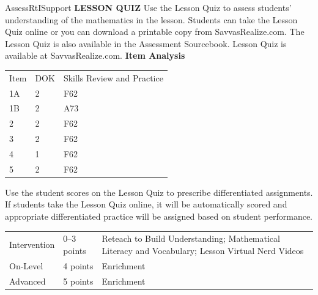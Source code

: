 \documentclass{article}
\newenvironment{te-addendum}[2]{}{}     %
\begin{document}
\begin{te-addendum}{Assess}{RtISupport}
\textbf{LESSON QUIZ}
Use the Lesson Quiz to assess students' understanding of the mathematics in the lesson.
Students can take the Lesson Quiz online or you can download a printable copy from SavvasRealize.com. The Lesson Quiz is also available in the Assessment Sourcebook.
Lesson Quiz is available at SavvasRealize.com.
\textbf{Item Analysis}
\begin{tabular}{lll}
Item & DOK & Skills Review and Practice \\
1A & 2 & F62 \\
1B & 2 & A73 \\
2 & 2 & F62 \\
3 & 2 & F62 \\
4 & 1 & F62 \\
5 & 2 & F62 \\
\end{tabular}
Use the student scores on the Lesson Quiz to prescribe differentiated assignments.
If students take the Lesson Quiz online, it will be automatically scored and appropriate differentiated practice will be assigned based on student performance.
\begin{tabular}{lll}
Intervention & 0--3 points & Reteach to Build Understanding; Mathematical Literacy and Vocabulary; Lesson Virtual Nerd Videos \\
On-Level & 4 points & Enrichment \\
Advanced & 5 points & Enrichment \\
\end{tabular}
\end{te-addendum}
\end{document}
